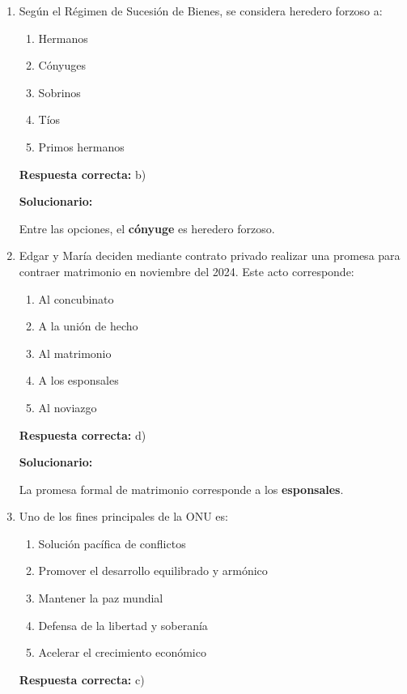 \begin{enumerate}[resume]

	
	\item Según el Régimen de Sucesión de Bienes, se considera heredero forzoso a:
	\begin{enumerate}[label=\alph*)]
		\item Hermanos
		\item Cónyuges
		\item Sobrinos
		\item Tíos
		\item Primos hermanos
	\end{enumerate}
	\textbf{Respuesta correcta:} b)
	
	\vspace{2mm}
	\textbf{Solucionario:}
	
	Entre las opciones, el \textbf{cónyuge} es heredero forzoso.
	
	\vspace{6mm}
	
	\item Edgar y María deciden mediante contrato privado realizar una promesa para contraer matrimonio en noviembre del 2024. Este acto corresponde:
	\begin{enumerate}[label=\alph*)]
		\item Al concubinato
		\item A la unión de hecho
		\item Al matrimonio
		\item A los esponsales
		\item Al noviazgo
	\end{enumerate}
	\textbf{Respuesta correcta:} d)
	
	\vspace{2mm}
	\textbf{Solucionario:}
	
	La promesa formal de matrimonio corresponde a los \textbf{esponsales}.
	
	\vspace{6mm}
	
	\item Uno de los fines principales de la ONU es:
	\begin{enumerate}[label=\alph*)]
		\item Solución pacífica de conflictos
		\item Promover el desarrollo equilibrado y armónico
		\item Mantener la paz mundial
		\item Defensa de la libertad y soberanía
		\item Acelerar el crecimiento económico
	\end{enumerate}
	\textbf{Respuesta correcta:} c)
	

\end{enumerate}

